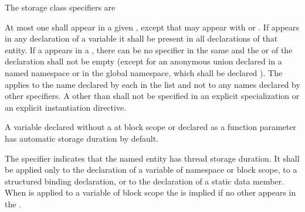 \pnum
The storage class specifiers are

\begin{bnf}
\br
    \br
    \br
    \br
\end{bnf}

At most one  shall appear in a given
, except that  may appear with  or
. If  appears in any declaration of
a variable it shall be present in all declarations of that entity. If a
appears in a , there can be no
 specifier in the same  and
the  or 
of the declaration shall not be
empty (except for an anonymous union declared in a named namespace or in the
global namespace, which shall be declared
%
). The
 applies to the name declared by each
 in the list and not to any names declared by
other specifiers. A 
other than 
shall not be
specified in an explicit specialization or an
explicit instantiation directive.

\pnum
\begin{note}
A variable declared without a 
at block scope or declared as a function parameter
has automatic storage duration by default.
\end{note}

\pnum
The  specifier
indicates that the named entity has thread storage duration. It
shall be applied only
to the declaration of a variable of namespace or block scope,
to a structured binding declaration, or
to the declaration of a static data member.
When  is applied to a variable of block scope the
  is implied if no other
 appears in the
.


